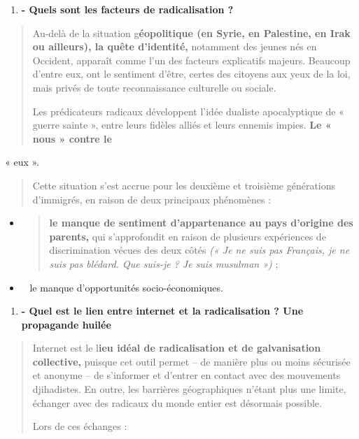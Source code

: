 \begin{enumerate}
\def\labelenumi{\arabic{enumi}.}
\setcounter{enumi}{1}
\item
  \textbf{- Quels sont les facteurs de radicalisation ?}
\end{enumerate}

\begin{quote}
Au-delà de la situation g\textbf{éopolitique (en Syrie, en Palestine, en
Irak ou ailleurs), la quête d'identité,} notamment des jeunes nés en
Occident, apparaît comme l'un des facteurs explicatifs majeurs. Beaucoup
d'entre eux, ont le sentiment d'être, certes des citoyens aux yeux de la
loi, mais privés de toute reconnaissance culturelle ou sociale.

Les prédicateurs radicaux développent l'idée dualiste apocalyptique de «
guerre sainte », entre leurs fidèles alliés et leurs ennemis impies.
\textbf{Le « nous » contre le}
\end{quote}

« eux ».

\begin{quote}
Cette situation s'est accrue pour les deuxième et troisième générations
d'immigrés, en raison de deux principaux phénomènes :
\end{quote}

\begin{itemize}
\item
  \begin{quote}
  \textbf{le manque de sentiment d'appartenance au pays d'origine des
  parents,} qui s'approfondit en raison de plusieurs expériences de
  discrimination vécues des deux côtés \emph{(« Je ne suis pas Français,
  je ne suis pas blédard. Que suis-je ? Je suis musulman »)} ;
  \end{quote}
\item ~
  le manque d'opportunités socio-économiques.
\end{itemize}

\begin{enumerate}
\def\labelenumi{\arabic{enumi}.}
\setcounter{enumi}{2}
\item
  \textbf{- Quel est le lien entre internet et la radicalisation ? Une
  propagande huilée}
\end{enumerate}

\begin{quote}
Internet est le l\textbf{ieu idéal de radicalisation et de galvanisation
collective,} puisque cet outil permet -- de manière plus ou moins
sécurisée et anonyme -- de s'informer et d'entrer en contact avec des
mouvements djihadistes. En outre, les barrières géographiques n'étant
plus une limite, échanger avec des radicaux du monde entier est
désormais possible.

Lors de ces échanges :
\end{quote}

